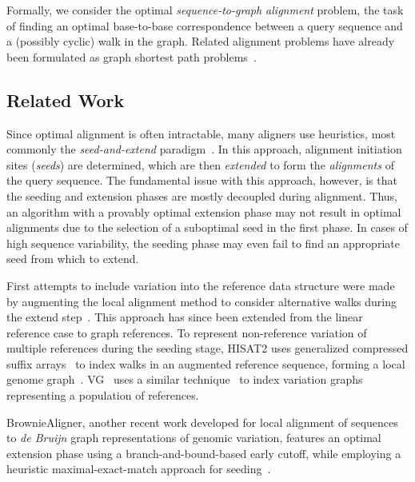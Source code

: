 Formally, we consider the optimal \textit{sequence-to-graph alignment} problem, the task of finding an optimal base-to-base correspondence between a query sequence and a (possibly cyclic) walk in the graph.
Related alignment problems have already been formulated as graph shortest path
problems~\cite{antipov_hybridspades_2016,jain_complexity_2019}.


\subsection{Related Work}
Since optimal alignment is often intractable, many aligners use heuristics, most
commonly the \emph{seed-and-extend}
paradigm~\cite{altschul_basic_1990,langmead_fast_2012,li_fast_2009}. In this
approach, alignment initiation sites (\emph{seeds}) are determined, which are
then \emph{extended} to form the \emph{alignments} of the query sequence. The
fundamental issue with this approach, however, is that the seeding and extension
phases are mostly decoupled during alignment. Thus, an algorithm with a provably
optimal extension phase may not result in optimal alignments due to the
selection of a suboptimal seed in the first phase. In cases of high sequence
variability, the seeding phase may even fail to find an appropriate seed from
which to extend.


First attempts to include variation into the reference data structure were made
by augmenting the local alignment method to consider alternative walks during the
extend step~\cite{schneeberger_simultaneous_2009,palmapper}. This approach has
since been extended from the linear reference case to graph references. To
represent non-reference variation of multiple references during the seeding
stage, HISAT2 uses generalized compressed suffix
arrays~\cite{siren_indexing_2014} to index walks in an augmented reference
sequence, forming a local genome graph~\cite{kim_graphbased_2019}.
VG~\cite{garrison_variation_2018} uses a similar
technique~\cite{siren_indexing_2017} to index variation graphs representing a
population of references.

BrownieAligner, another recent work developed for local alignment of sequences
to {\itshape de Bruijn} graph representations of genomic variation, features an
optimal extension phase using a branch-and-bound-based early cutoff, while
employing a heuristic maximal-exact-match approach for
seeding~\cite{heydari_browniealigner_2018}.

